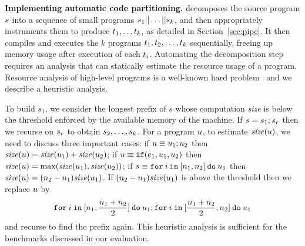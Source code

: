 \noindent\textbf{Implementing automatic code partitioning.}
\tool decomposes the source program
$s$ into a sequence of small programs
$s_1||\dots||s_k$, and then appropriately instruments them
to produce $t_1,\dots t_k$, as detailed in
Section~\ref{sec:pipe}. It then
compiles and executes the $k$ programs
$t_1,t_2,\ldots,t_k$ sequentially, freeing up memory
usage after execution of each $t_i$.
Automating the  decomposition step requires an analysis that can 
statically estimate the resource usage of a \tool program.
Resource analysis of high-level programs is a well-known hard problem~\cite{raml}
and we describe a heuristic analysis.

To build $s_1$, we consider the longest
prefix of $s$ whose computation {\it size} is below the threshold enforced by the available memory of the machine.
If $s = s_1; s_r$ then we recurse on $s_r$ to obtain $s_2,\ldots,s_k$.
For a program $u$, to estimate ${\it size}(u)$, we need to discuss three important cases: if $u\equiv u_1;u_2$
then ${\it size}(u)={\it size}(u_1)+{\it size}(u_2)$; if $u\equiv{\ensuremath{\mathtt{if}}}({e_1}, {u_1}, {u_2})$ then ${\it size}(u)=\max({\it size}(u_1),{\it size}(u_2))$; if $s\equiv{\ensuremath{\mathtt{for}}}\:{i}\:{\mathtt{in}}\:[{n_1}, {n_2}]\:{\mathtt{do}}\:{u_1}$ then
${\it size}(u)=(n_2-n_1){\it size}(u_1)$. If $(n_2-n_1){\it size}(u_1)$ is above the threshold then
we replace $u$ by 
\[{\mathtt{for}}\:{i}\:{\mathtt{in}}\:[{n_1}, {\frac{n_1+n_2}{2}}]\:{\mathtt{do}}\:{u_1}; {\mathtt{for}}\:{i}\:{\mathtt{in}}\:[{\frac{n_1+n_2}{2}}, {n_2}]\:{\mathtt{do}}\:{u_1}\]
 and recurse to find the prefix again.
This heuristic analysis is sufficient for the benchmarks discussed in
our evaluation.
